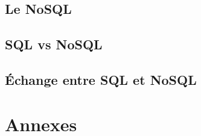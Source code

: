                 \chapter{Le \textsf{NoSQL}}


                
                \chapter{\textsf{SQL} vs \textsf{NoSQL}}
            
                \chapter{Échange entre \textsf{SQL} et \textsf{NoSQL}}

\nocite{*}



\part{Annexes}
\appendix



